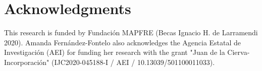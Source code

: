 \documentclass[12pt,twoside, A4paper]{article}
\begin{document}



\section*{Acknowledgments}
This research is funded by Fundaci\'on MAPFRE (Becas Ignacio H. de Larramendi 2020). Amanda Fern\'andez-Fontelo also acknowledges the Agencia Estatal de Investigaci\'on (AEI) for funding her research with the grant "Juan de la Cierva-Incorporaci\'on" (IJC2020-045188-I / AEI / 10.13039/501100011033).
\end{document}
